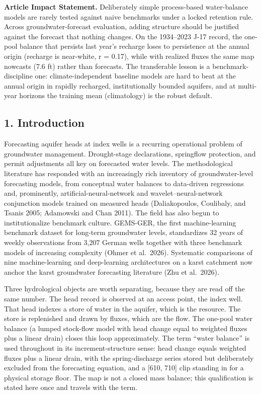 \documentclass[11pt]{article}
\begin{document}
\textbf{Article Impact Statement.} Deliberately simple process-based
water-balance models are rarely tested against naive benchmarks under a
locked retention rule. Across groundwater-forecast evaluation, adding
structure should be justified against the forecast that nothing changes.
On the 1934--2023 J-17 record, the one-pool balance that persists last
year's recharge loses to persistence at the annual origin (recharge is
near-white, r = 0.17), while with realized fluxes the same map nowcasts
(7.6 ft) rather than forecasts. The transferable lesson is a
benchmark-discipline one: climate-independent baseline models are hard
to beat at the annual origin in rapidly recharged, institutionally
bounded aquifers, and at multi-year horizons the training mean (climatology)
is the robust default.

\subsection{1. Introduction}\label{edw-introduction}

Forecasting aquifer heads at index wells is a recurring operational
problem of groundwater management. Drought-stage declarations,
springflow protection, and permit adjustments all key on forecasted
water levels. The methodological literature has responded with an
increasingly rich inventory of groundwater-level forecasting models,
from conceptual water balances to data-driven regressions and,
prominently, artificial-neural-network and wavelet--neural-network
conjunction models trained on measured heads (Daliakopoulos, Coulibaly,
and Tsanis 2005; Adamowski and Chan 2011). The field has also begun to
institutionalize benchmark culture. GEMS-GER, the first machine-learning
benchmark dataset for long-term groundwater levels, standardizes 32
years of weekly observations from 3,207 German wells together with three
benchmark models of increasing complexity (Ohmer et al.~2026).
Systematic comparisons of nine machine-learning and deep-learning
architectures on a karst catchment now anchor the karst groundwater
forecasting literature (Zhu et al.~2026).

Three hydrological objects are worth separating, because they are read
off the same number. The head record is observed at an access point, the
index well. That head indexes a store of water in the aquifer, which is
the resource. The store is replenished and drawn by fluxes, which are
the flow. The one-pool water balance (a lumped stock-flow model with
head change equal to weighted fluxes plus a linear drain) closes this
loop approximately. The term ``water balance'' is used throughout in its
increment-structure sense: head change equals weighted fluxes plus a
linear drain, with the spring-discharge series stored but deliberately
excluded from the forecasting equation, and a {[}610, 710{]} clip
standing in for a physical storage floor. The map is not a closed mass
balance; this qualification is stated here once and travels with the
term.
\end{document}

